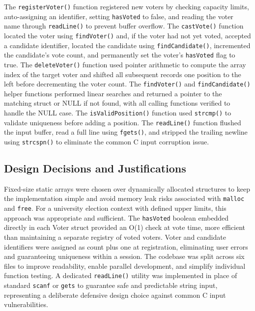 \documentclass[12pt,a4paper]{article}
\begin{document}
The \texttt{registerVoter()} function registered new voters by checking capacity limits,
auto-assigning an identifier, setting \texttt{hasVoted} to false, and reading the voter name
through \texttt{readLine()} to prevent buffer overflow. The \texttt{castVote()} function located
the voter using \texttt{findVoter()} and, if the voter had not yet voted, accepted a candidate
identifier, located the candidate using \texttt{findCandidate()}, incremented the candidate's
vote count, and permanently set the voter's \texttt{hasVoted} flag to true. The
\texttt{deleteVoter()} function used pointer arithmetic to compute the array index of the
target voter and shifted all subsequent records one position to the left before
decrementing the voter count. The \texttt{findVoter()} and \texttt{findCandidate()} helper
functions performed linear searches and returned a pointer to the matching struct or
NULL if not found, with all calling functions verified to handle the NULL case. The
\texttt{isValidPosition()} function used \texttt{strcmp()} to validate uniqueness before adding a
position. The \texttt{readLine()} function flushed the input buffer, read a full line using
\texttt{fgets()}, and stripped the trailing newline using \texttt{strcspn()} to eliminate the
common C input corruption issue.

\subsection{Design Decisions and Justifications}

Fixed-size static arrays were chosen over dynamically allocated structures to keep the
implementation simple and avoid memory leak risks associated with \texttt{malloc} and
\texttt{free}. For a university election context with defined upper limits, this approach was
appropriate and sufficient. The \texttt{hasVoted} boolean embedded directly in each Voter
struct provided an O(1) check at vote time, more efficient than maintaining a separate
registry of voted voters. Voter and candidate identifiers were assigned as count plus
one at registration, eliminating user errors and guaranteeing uniqueness within a
session. The codebase was split across six files to improve readability, enable parallel
development, and simplify individual function testing. A dedicated \texttt{readLine()} utility
was implemented in place of standard \texttt{scanf} or \texttt{gets} to guarantee safe and
predictable string input, representing a deliberate defensive design choice against
common C input vulnerabilities.
\end{document}

